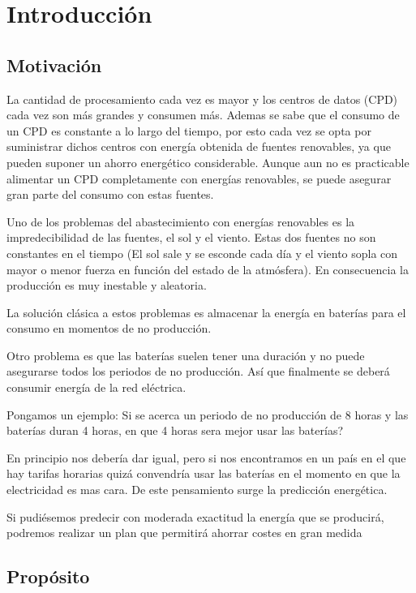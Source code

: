\chapter{Introducción}


\section{Motivación}

La cantidad de procesamiento cada vez es mayor y los centros de datos (CPD) cada vez son más grandes y consumen más. Ademas se sabe que el consumo de un CPD es constante a lo largo del tiempo, por esto cada vez se opta por suministrar dichos centros con energía obtenida de fuentes renovables, ya que pueden suponer un ahorro energético considerable. Aunque aun no es practicable alimentar un CPD completamente con energías renovables, se puede asegurar gran parte del consumo con estas fuentes.

Uno de los problemas del abastecimiento con energías renovables es la impredecibilidad de las fuentes, el sol y el viento. Estas dos fuentes no son constantes en el tiempo (El sol sale y se esconde cada día y el viento sopla con mayor o menor fuerza en función del estado de la atmósfera). En consecuencia la producción es muy inestable y aleatoria.

La solución clásica a estos problemas es almacenar la energía en baterías para el consumo en momentos de no producción.

Otro problema es que las baterías suelen tener una duración y no puede asegurarse todos los periodos de no producción. Así que finalmente se deberá consumir energía de la red eléctrica.

Pongamos un ejemplo: Si se acerca un periodo de no producción de 8 horas y las baterías duran 4 horas, en que 4 horas sera mejor usar las baterías?

En principio nos debería dar igual, pero si nos encontramos en un país en el que hay tarifas horarias quizá convendría usar las baterías en el momento en que la electricidad es mas cara.
De este pensamiento surge la predicción energética.

Si pudiésemos predecir con moderada exactitud la energía que se producirá, podremos realizar un plan que permitirá ahorrar costes en gran medida


\section{Propósito}

